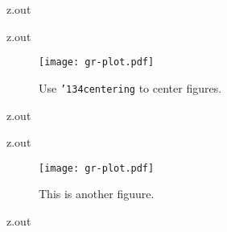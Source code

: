 \MyIO


\begin{VerbatimOut}{z.out}

\end{VerbatimOut}

\MyIO


\begin{VerbatimOut}{z.out}

\begin{figure}[ht]
  \centering
  \texttt{[image: gr-plot.pdf]}
  \caption{Use {\tt \char'134centering\/} to center figures.}
  \label{fi:centered}
\end{figure}
\end{VerbatimOut}

\MyIO


\begin{VerbatimOut}{z.out}

\end{VerbatimOut}

\MyIO


\begin{VerbatimOut}{z.out}

\begin{figure}[ht]
  \centering
  \texttt{[image: gr-plot.pdf]}
  \caption{This is another figuure.}
  \label{fi:another}
\end{figure}
\end{VerbatimOut}

\MyIO


\begin{VerbatimOut}{z.out}

\end{VerbatimOut}

\MyIO



\MyIO



